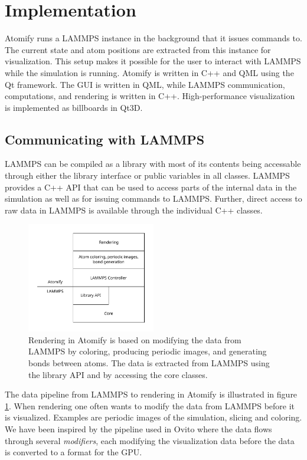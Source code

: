 \documentclass[aps,pre,twocolumn,letterpaper,floatfix,nofootinbib]{revtex4}
\begin{document}
\section{\label{sec:implementation}Implementation}


Atomify runs a LAMMPS instance in the background that it issues commands to.
The current state and atom positions are extracted from this instance for
visualization.
This setup makes it possible for the user to interact with LAMMPS while the
simulation is running.
Atomify is written in C++ and QML using the Qt framework.
The GUI is written in QML, while LAMMPS communication,
computations, and rendering is written in C++.
High-performance visualization is implemented as billboards in Qt3D.

\subsection{Communicating with LAMMPS}

LAMMPS can be compiled as a library with most of its contents being accessable
through either the library interface or public variables in all classes.
LAMMPS provides a C++ API that can be used to access parts of the internal data
in the simulation as well as for issuing commands to LAMMPS.
Further, direct access to raw data in LAMMPS is available through the individual
C++ classes.

\begin{figure}
	\centering
	\includegraphics[width=0.5\textwidth]{figures/data-pipeline.pdf}
	\caption{Rendering in Atomify is based on modifying the data from LAMMPS
    by coloring, producing periodic images, and generating bonds between atoms.
    The data is extracted from LAMMPS using the library API and by accessing
    the core classes.}
	\label{fig:data-pipeline}
\end{figure}

The data pipeline from LAMMPS to rendering in Atomify is illustrated in figure
\ref{fig:data-pipeline}.
When rendering one often wants to modify the data from LAMMPS before it is
visualized.
Examples are periodic images of the simulation,
slicing and coloring.
We have been inspired by the pipeline used in Ovito where the data flows through
several \textit{modifiers}, each modifying the visualization data before the
data is converted to a format for the GPU.
\end{document}
